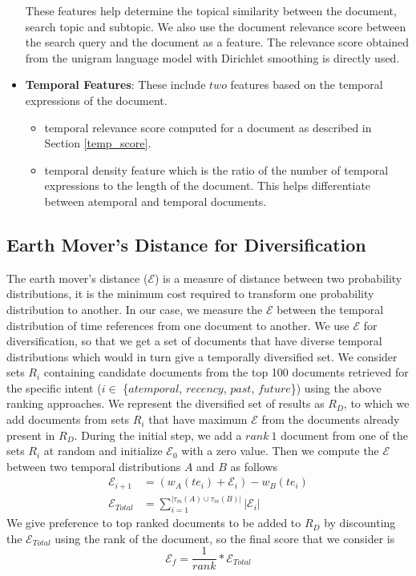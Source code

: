 \documentclass{sig-alternate}
\begin{document}
\begin{itemize}
These features help determine the topical similarity between the document, search topic and subtopic. We also use the \textsf{document relevance score} between the search query and the document as a feature. The relevance score obtained from the unigram language model with Dirichlet smoothing is directly used. 
\item\textbf{Temporal Features}: These include $two$ features based on the temporal expressions of the document.
       \begin{itemize}
       \item \textsf{temporal relevance score} computed for a document as described in Section \ref{temp_score}.
       \item \textsf{temporal density feature} which is the ratio of the number of temporal expressions to the length of the document. This helps differentiate between atemporal and temporal documents. 
       \end{itemize}
\end{itemize}
\subsection{Earth Mover's Distance for Diversification}\label{diversification}
The earth mover's distance ($\mathcal E$) is a measure of distance between two probability distributions, it is the minimum cost required to transform one probability distribution to another. In our case, we measure the $\mathcal E$ between the temporal distribution of time references from one document to another.  We use $\mathcal E$ for diversification, so that we get a set of documents that have diverse temporal distributions which would in turn give a temporally diversified set. We consider sets $R_{i}$ containing candidate documents from the top 100 documents retrieved for the specific intent ($i \in$ \{$atemporal$, $recency$, $past$, $future$\}) using the above ranking approaches. We represent the diversified set of results as $R_{D}$, to which we add documents from sets $R_{i}$ that have maximum $\mathcal E$ from the documents already present in $R_{D}$. During the initial step, we add a $rank\ 1$ document from one of the sets $R_{i}$ at random and initialize $\mathcal E_{0}$ with a zero value. Then we compute the $\mathcal E$ between two temporal distributions $A$ and $B$ as follows
\begin{equation}\label{eq:8}
	\begin{aligned}
		\mathcal E_{i+1} &= (w_{A}(te_{i}) + \mathcal E_{i}) - w_{B}(te_{i}) \\
		\mathcal E_{Total} &= \sum\limits_{i=1}^{|\tau_{m}(A) \cup \tau_{m}(B)|}|\mathcal E_{i}|
	\end{aligned}
\end{equation}
We give preference to top ranked documents to be added to $R_{D}$ by discounting the $\mathcal E_{Total}$ using the rank of the document, so the final score that we consider is
\begin{equation}\label{eq:9}
       \mathcal E_{f} = \frac{1}{rank} * \mathcal E_{Total}
\end{equation}
\end{document}
